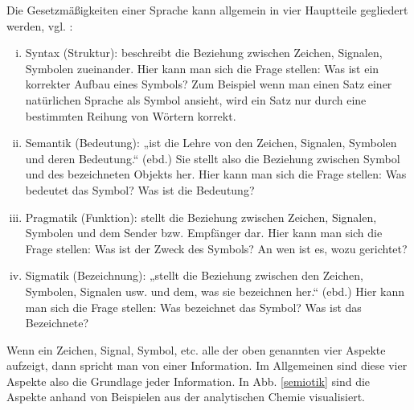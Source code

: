 Die Gesetzmäßigkeiten einer Sprache kann allgemein in vier Hauptteile gegliedert werden, vgl. \citep[S.~8]{Malissa}:

 
\begin{enumerate}[(i)]

\item
Syntax (Struktur): beschreibt die Beziehung zwischen Zeichen, Signalen, Symbolen zueinander. Hier kann man sich die Frage stellen: Was ist ein korrekter Aufbau eines Symbols? Zum Beispiel wenn man einen Satz einer natürlichen Sprache als Symbol ansieht, wird ein Satz nur durch eine bestimmten Reihung von Wörtern korrekt.


\item
Semantik (Bedeutung): „ist die Lehre von den Zeichen, Signalen, Symbolen und deren Bedeutung.“ (ebd.) Sie stellt also die Beziehung zwischen Symbol und des bezeichneten Objekts her. Hier kann man sich die Frage stellen: Was bedeutet das Symbol? Was ist die Bedeutung?


\item
Pragmatik (Funktion): stellt die Beziehung zwischen Zeichen, Signalen, Symbolen und dem Sender bzw. Empfänger dar. Hier kann man sich die Frage stellen: Was ist der Zweck des Symbols? An wen ist es, wozu gerichtet?


\item
Sigmatik (Bezeichnung): „stellt die Beziehung zwischen den Zeichen, Symbolen, Signalen usw. und dem, was sie bezeichnen her.“ (ebd.) Hier kann man sich die Frage stellen: Was bezeichnet das Symbol? Was ist das Bezeichnete?


\end{enumerate}
 
Wenn ein Zeichen, Signal, Symbol, etc. alle der oben genannten vier Aspekte aufzeigt, dann spricht man von einer Information. Im Allgemeinen sind diese vier Aspekte also die Grundlage jeder Information. In Abb. \ref{semiotik} sind die Aspekte anhand von Beispielen aus der analytischen Chemie visualisiert.

